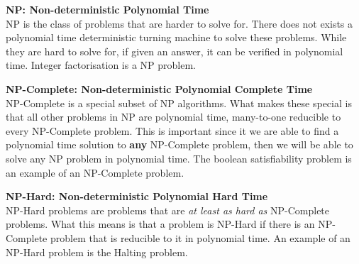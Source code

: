 \documentclass[9pt]{extarticle} %
\begin{document}
\begin{minipage}[t]{.61\linewidth}
\textbf{NP: Non-deterministic Polynomial Time} \\
NP is the class of problems that are harder to solve for. There does not exists a polynomial time deterministic turning machine to solve these problems. While they are hard to solve for, if given an answer, it can be verified in polynomial time. Integer factorisation is a NP problem.

\textbf{NP-Complete: Non-deterministic Polynomial Complete Time} \\
NP-Complete is a special subset of NP algorithms. What makes these special is that all other problems in NP are polynomial time, many-to-one reducible to every NP-Complete problem. This is important since it we are able to find a polynomial time solution to \textbf{any} NP-Complete problem, then we will be able to solve any NP problem in polynomial time. The boolean satisfiability problem is an example of an NP-Complete problem.

\textbf{NP-Hard: Non-deterministic Polynomial Hard Time} \\
NP-Hard problems are problems that are \textit{at least as hard as} NP-Complete problems. What this means is that a problem is NP-Hard if there is an NP-Complete problem that is reducible to it in polynomial time. An example of an NP-Hard problem is the Halting problem.


\end{minipage} %
\end{document}
